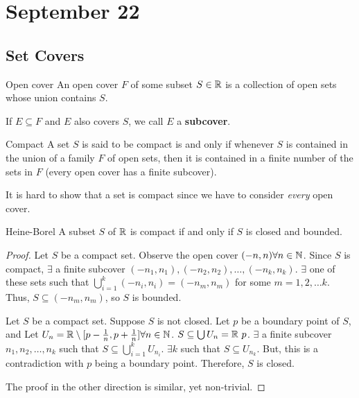 \section{September 22}

\subsection{Set Covers}
\begin{definition}{Open cover}{}
    An open cover $F$ of some subset $S \in \mathbb{R}$ is a collection of open sets whose union contains $S$.
\end{definition}
\begin{note}
    If $E \subseteq F$ and $E$ also covers $S$, we call $E$ a \textbf{subcover}.
\end{note}

\begin{definition}{Compact}{}
    A set $S$ is said to be compact is and only if whenever $S$ is contained in the union of a family $F$ of open sets, then it is contained in a finite number of the sets in $F$ (every open cover has a finite subcover).
\end{definition}
\begin{note}
    It is hard to show that a set is compact since we have to consider \emph{every} open cover.
\end{note}

\begin{theorem}{Heine-Borel}{}
    A subset $S$ of $\mathbb{R}$ is compact if and only if $S$ is closed and bounded.
\end{theorem}
\begin{proof}
    Let $S$ be a compact set. Observe the open cover $(-n, n) \forall n \in \mathbb{N}$. Since $S$ is compact, $\exists$ a finite subcover $(-n_1, n_1), (-n_2, n_2), \ldots, (-n_k, n_k)$. $\exists$ one of these sets such that $\bigcup_{i=1}^k (-n_i, n_i) = (-n_m, n_m)$ for some $m = 1, 2, \ldots k$. Thus, $S \subseteq (-n_m, n_m)$, so $S$ is bounded.

    Let $S$ be a compact set. Suppose $S$ is not closed. Let $p$ be a boundary point of $S$, and Let $U_n = \mathbb{R} \setminus [p - \frac{1}{n}, p + \frac{1}{n}] \forall n \in \mathbb{N}$. $S \subseteq \bigcup U_n = \mathbb{R} \ {p}$. $\exists$ a finite subcover $n_1, n_2, \ldots, n_k$ such that $S \subseteq \bigcup_{i=1}^k U_{n_i}$. $\exists k$ such that $S \subseteq U_{n_k}$. But, this is a contradiction with $p$ being a boundary point. Therefore, $S$ is closed.

    The proof in the other direction is similar, yet non-trivial.
\end{proof}

